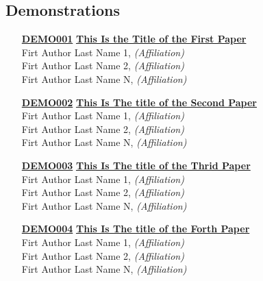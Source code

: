 \subsection{Demonstrations}
\begin{enumerate}
\item[\href{https://doi.org/10.1145/1122445.1122456}{\textbf{DEMO001}}]
\href{https://doi.org/10.1145/1122445.1122456}{\textbf{This Is the Title of the First Paper}}\\
Firt Author Last Name 1, \emph{(Affiliation)}\\
Firt Author Last Name 2, \emph{(Affiliation)}\\
Firt Author Last Name N, \emph{(Affiliation)}\\

\item[\href{https://doi.org/10.1145/1122445.1122456}{\textbf{DEMO002}}]
\href{https://doi.org/10.1145/1122445.1122456}{\textbf{This Is The title of the Second Paper}}\\
Firt Author Last Name 1, \emph{(Affiliation)}\\
Firt Author Last Name 2, \emph{(Affiliation)}\\
Firt Author Last Name N, \emph{(Affiliation)}\\

\item[\href{https://doi.org/10.1145/1122445.1122456}{\textbf{DEMO003}}]
\href{https://doi.org/10.1145/1122445.1122456}{\textbf{This Is The title of the Thrid Paper}}\\
Firt Author Last Name 1, \emph{(Affiliation)}\\
Firt Author Last Name 2, \emph{(Affiliation)}\\
Firt Author Last Name N, \emph{(Affiliation)}\\

\item[\href{https://doi.org/10.1145/1122445.1122456}{\textbf{DEMO004}}]
\href{https://doi.org/10.1145/1122445.1122456}{\textbf{This Is The title of the Forth Paper}}\\
Firt Author Last Name 1, \emph{(Affiliation)}\\
Firt Author Last Name 2, \emph{(Affiliation)}\\
Firt Author Last Name N, \emph{(Affiliation)}\\
\end{enumerate}



